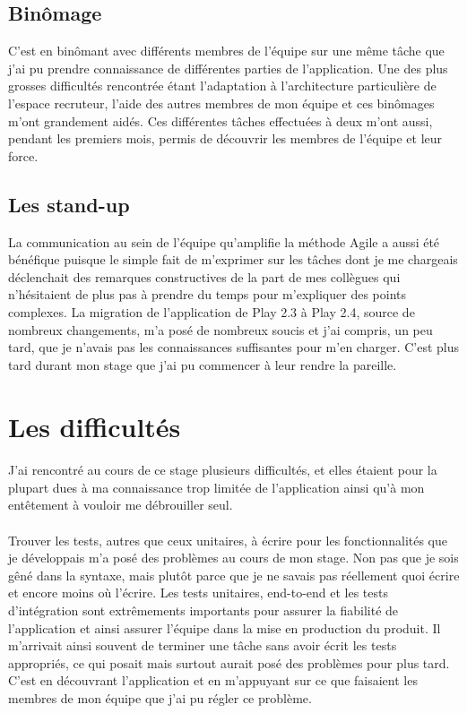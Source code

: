 \subsection{Binômage}
C'est en binômant avec différents membres de l'équipe sur une même tâche que j'ai pu prendre connaissance de différentes parties de l'application.
Une des plus grosses difficultés rencontrée étant l'adaptation à l'architecture particulière de l'espace recruteur, l'aide des autres membres de mon équipe et ces binômages m'ont grandement aidés.
Ces différentes tâches effectuées à deux m'ont aussi, pendant les premiers mois, permis de découvrir les membres de l'équipe et leur force.
\subsection{Les stand-up}
La communication au sein de l'équipe qu'amplifie la méthode Agile a aussi été bénéfique puisque le simple fait de m'exprimer sur les tâches dont je me chargeais déclenchait des remarques constructives de la part de mes collègues qui n'hésitaient de plus pas à prendre du temps pour m'expliquer des points complexes.
La migration de l'application de Play 2.3 à Play 2.4, source de nombreux changements, m'a posé de nombreux soucis et j'ai compris, un peu tard, que je n'avais pas les connaissances suffisantes pour m'en charger.
C'est plus tard durant mon stage que j'ai pu commencer à leur rendre la pareille.

\section{Les difficultés}
\paragraph{}
J'ai rencontré au cours de ce stage plusieurs difficultés, et elles étaient pour la plupart dues à ma connaissance trop limitée de l'application ainsi qu'à mon entêtement à vouloir me débrouiller seul.
\paragraph{}
Trouver les tests, autres que ceux unitaires, à écrire pour les fonctionnalités que je développais m'a posé des problèmes au cours de mon stage.
Non pas que je sois gêné dans la syntaxe, mais plutôt parce que je ne savais pas réellement quoi écrire et encore moins où l'écrire.
Les tests unitaires, end-to-end et les tests d'intégration sont extrêmements importants pour assurer la fiabilité de l'application et ainsi assurer l'équipe dans la mise en production du produit.
Il m'arrivait ainsi souvent de terminer une tâche sans avoir écrit les tests appropriés, ce qui posait mais surtout aurait posé des problèmes pour plus tard.
C'est en découvrant l'application et en m'appuyant sur ce que faisaient les membres de mon équipe que j'ai pu régler ce problème.
